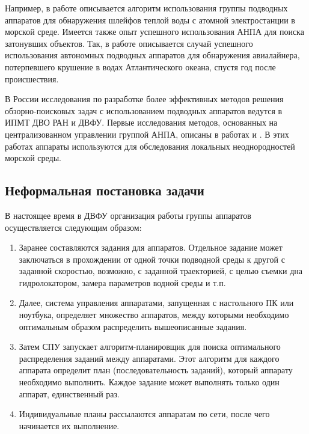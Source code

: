 \documentclass[a4paper,14pt,russian]{article}
\begin{document}
Например, в работе \cite{cannell2006boundary} описывается алгоритм использования группы подводных аппаратов для обнаружения шлейфов теплой воды с атомной электростанции в морской среде.
Имеется также опыт успешного использования АНПА для поиска затонувших объектов.
Так, в работе \cite{purcell2011use} описывается случай успешного использования автономных подводных аппаратов для обнаружения авиалайнера, потерпевшего крушение в водах Атлантического океана, спустя год после происшествия.

В России исследования по разработке более эффективных методов решения обзорно-поисковых задач с использованием подводных аппаратов ведутся в ИПМТ ДВО РАН и ДВФУ. Первые исследования методов, основанных на централизованном управлении группой АНПА, описаны в работах \cite{tuphanov1} и \cite{tuphanov2}. В этих работах аппараты используются для обследования локальных неоднородностей морской среды.



\subsection{Неформальная постановка задачи}


В настоящее время в ДВФУ организация работы группы аппаратов осуществляется следующим образом:
\begin{enumerate}
\item Заранее составляются задания для аппаратов. Отдельное задание может заключаться в прохождении от одной точки подводной среды к другой с заданной скоростью, возможно, с заданной траекторией, с целью съемки дна гидролокатором, замера параметров водной среды и т.п.
\item Далее, система управления аппаратами, запущенная с настольного ПК или ноутбука, определяет множество аппаратов, между которыми необходимо оптимальным образом распределить вышеописанные задания.
\item Затем СПУ запускает алгоритм-планировщик для поиска оптимального распределения заданий между аппаратами. Этот алгоритм для каждого аппарата определит план (последовательность заданий), который аппарату необходимо выполнить. Каждое задание может выполнять только один аппарат, единственный раз.
\item Индивидуальные планы рассылаются аппаратам по сети, после чего начинается их выполнение.
\end{enumerate}
\end{document}

